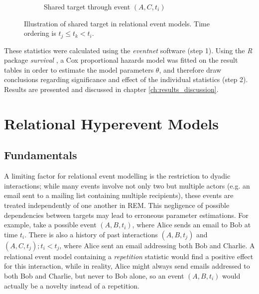 \begin{figure}
\begin{subfigure}[t]{0.3\linewidth}
		\caption{Shared target through event $(A,C,t_i)$}
	\end{subfigure}
	\hfill
	\caption{Illustration of shared target in relational event models. Time ordering is $t_j \leq t_k < t_i$.}
	\label{fig:rem_triangle_parents}
\end{figure}

These statistics were calculated using the \emph{eventnet} software \cite{eventnet_rem,eventnet_rhem} (step 1). Using the \emph{R} package \emph{survival} \cite{survival-package}, a Cox proportional hazards model was fitted on the result tables in order to estimate the model parameters $\theta$, and therefore draw conclusions regarding significance and effect of the individual statistics (step 2). Results are presented and discussed in chapter \ref{ch:results_discussion}.

\section{Relational Hyperevent Models}
\label{sec:rhem}

\subsection{Fundamentals}
\label{sec:rhem_fundamentals}

A limiting factor for relational event modelling is the restriction to dyadic interactions; while many events involve not only two but multiple actors (e.g. an email sent to a mailing list containing multiple recipients), these events are treated independently of one another in REM. This negligence of possible dependencies between targets may lead to erroneous parameter estimations. For example, take a possible event $(A,B,t_i)$, where Alice sends an email to Bob at time $t_i$. There is also a history of past interactions $(A,B,t_j)$ and $(A,C,t_j); t_i < t_j$, where Alice sent an email addressing both Bob and Charlie. A relational event model containing a \emph{repetition} statistic would find a positive effect for this interaction, while in reality, Alice might always send emails addressed to both Bob and Charlie, but never to Bob alone, so an event $(A,B,t_i)$ would actually be a novelty instead of a repetition. 

